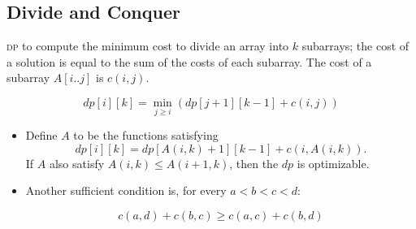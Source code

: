\subsection{Divide and Conquer}

\textsc{dp} to compute the minimum cost to divide an array into $k$ subarrays; the cost of a solution is equal to the sum of the costs of each subarray. The cost of a subarray $A[i..j]$ is $c(i, j)$.

$$dp[i][k] = \min_{j \ge i} \left( dp[j+1][k-1] + c(i, j) \right)$$

\begin{itemize}
    \item  Define $A$ to be the functions satisfying 
    $$dp[i][k] = dp[A(i, k) + 1][k-1] + c(i, A(i, k)).$$
    If $A$ also satisfy $A(i, k) \le A(i+1, k)$, then the $dp$ is optimizable. 
    
    \item Another sufficient condition is, for every $a < b < c < d$:
    
    $$ c(a, d) + c(b, c) \geq c(a, c) + c(b, d) $$
\end{itemize}
